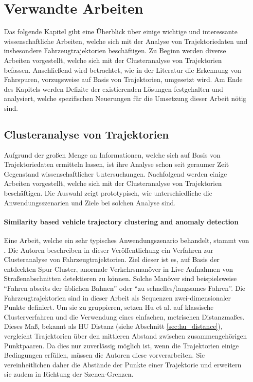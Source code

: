 ﻿%

\chapter{Verwandte Arbeiten}
\label{cha:related_work}

Das folgende Kapitel gibt eine Überblick über einige wichtige und interessante wissenschaftliche
Arbeiten, welche sich mit der Analyse von Trajektoriedaten und insbesondere Fahrzeugtrajektorien beschäftigen.
Zu Beginn werden diverse Arbeiten vorgestellt, welche sich mit der Clusteranalyse von Trajektorien befassen.
Anschließend wird betrachtet, wie in der Literatur die Erkennung von Fahrspuren, vorzugsweise auf Basis
von Trajektorien, umgesetzt wird.
Am Ende des Kapitels werden Defizite der existierenden Lösungen festgehalten und analysiert, welche
spezifischen Neuerungen für die Umsetzung dieser Arbeit nötig sind.

\section{Clusteranalyse von Trajektorien}
\label{sec:rw_clustering}

Aufgrund der großen Menge an Informationen, welche sich auf Basis von Trajektoriedaten ermitteln lassen, ist ihre
Analyse schon seit geraumer Zeit Gegenstand wissenschaftlicher Untersuchungen.
Nachfolgend werden einige Arbeiten vorgestellt, welche sich mit der Clusteranalyse von Trajektorien beschäftigen.
Die Auswahl zeigt prototypisch, wie unterschiedliche die Anwendungsszenarien und Ziele bei solchen Analyse sind.

\subsubsection*{Similarity based vehicle trajectory clustering and anomaly detection}
Eine Arbeit, welche ein sehr typisches Anwendungszenario behandelt, stammt von \cite[]{Hu2005}. Die Autoren
beschreiben in dieser Veröffentlichung ein Verfahren zur Clusteranalyse von Fahrzeugtrajektorien. Ziel dieser
ist es, auf Basis der entdeckten Spur-Cluster, anormale Verkehrsmanöver in Live-Aufnahmen von Straßenabschnitten
detektieren zu können. Solche Manöver sind beispielsweise ``Fahren abseits der üblichen Bahnen'' oder
``zu schnelles/langsames Fahren''.
Die Fahrzeugtrajektorien sind in dieser Arbeit als Sequenzen zwei-dimensionaler Punkte definiert.
Um sie zu gruppieren, setzen Hu et al. auf klassische Clusterverfahren und die Verwendung eines
einfachen, metrischen Distanzmaßes. Dieses Maß, bekannt als HU Distanz (siehe Abschnitt \ref{sec:hu_distance}),
vergleicht Trajektorien über den mittleren Abstand zwischen zusammengehörigen Punktpaaren.
Da dies nur zuverlässig möglich ist, wenn die Trajektorien einige Bedingungen erfüllen, müssen die
Autoren diese vorverarbeiten. Sie vereinheitlichen daher die Abstände der Punkte einer Trajektorie und erweitern
sie zudem in Richtung der Szenen-Grenzen.

